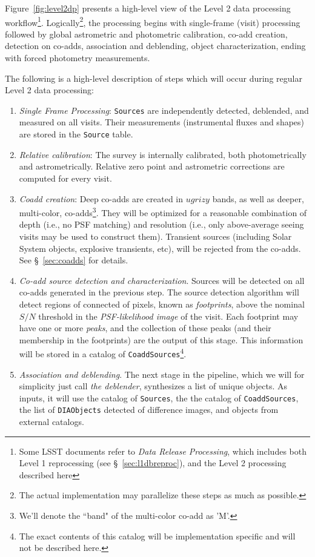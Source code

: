 \documentclass[12pt]{article}
\newcommand{\code}[1]{\texttt{#1}}
\newcommand{\DIAObjects}{\code{DIAObjects}\xspace}
\newcommand{\Source}{\code{Source}\xspace}
\newcommand{\Sources}{\code{Sources}\xspace}
\newcommand{\CoaddSources}{\code{CoaddSources}\xspace}
\begin{document}
Figure~\ref{fig:level2dp} presents a high-level view of the Level 2 data processing workflow\footnote{Some LSST documents refer to {\em Data Release Processing}, which includes both Level 1 reprocessing (see \S~\ref{sec:l1dbreproc}), and the Level 2 processing described here}. Logically\footnote{The actual implementation may parallelize these steps as much as possible.}, the processing begins with single-frame (visit) processing followed by global astrometric and photometric calibration, co-add creation, detection on co-adds, association and deblending, object characterization, ending with forced photometry measurements.

The following is a high-level description of steps which will occur during regular Level 2 data processing:
\begin{enumerate}
    \item {\em Single Frame Processing}: \Sources are independently detected, deblended, and measured on all visits. Their measurements (instrumental fluxes and shapes) are stored in the \Source table.
    \item {\em Relative calibration}: The survey is internally calibrated, both photometrically and astrometrically. Relative zero point and astrometric corrections are computed for every visit.
    \item {\em Coadd creation}: Deep co-adds are created in $ugrizy$ bands, as well as deeper, multi-color, co-adds\footnote{We'll denote the ``band" of the multi-color co-add as 'M'.}. They will be optimized for a reasonable combination of depth (i.e., no PSF matching) and resolution (i.e., only above-average seeing visits may be used to construct them). Transient sources (including Solar System objects, explosive transients, etc), will be rejected from the co-adds. See \S~\ref{sec:coadds} for details.
    \item {\em Co-add source detection and characterization}. Sources will be detected on all co-adds generated in the previous step. The source detection algorithm will detect regions of connected of pixels, known as {\em footprints}, above the nominal $S/N$ threshold in the {\em PSF-likelihood image} of the visit. Each footprint may have one or more {\em peaks}, and the collection of these peaks (and their membership in the footprints) are the output of this stage. This information will be stored in a catalog of \CoaddSources\footnote{The exact contents of this catalog will be implementation specific and will not be described here.}.
    \item {\em Association and deblending}. The next stage in the pipeline, which we will for simplicity just call {\em the deblender}, synthesizes a list of unique objects. As inputs, it will use the catalog of \Sources, the the catalog of \CoaddSources, the list of \DIAObjects detected of difference images, and objects from external catalogs.
    

\end{enumerate}
\end{document}
